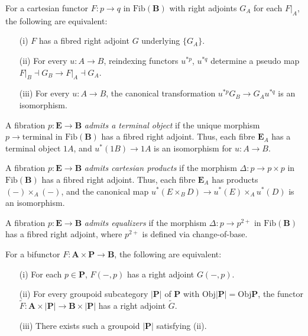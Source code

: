 \documentclass{article}
\begin{document}
\begin{proposition}
\label{prop:3.4}
For a cartesian functor $F : p \to q$ in $\text{Fib}(\mathbf{B})$ with right adjoints $G_A$ for each $\left.F\right|_A$, the following are equivalent:
\begin{enumerate}
    \item[(i)] $F$ has a fibred right adjoint $G$ underlying $\{ G_A \}$.
    \item[(ii)] For every $u : A \to B$, reindexing functors $u^{*p}$, $u^{*q}$ determine a pseudo map $\left.F\right|_B \dashv G_B \to \left.F\right|_A \dashv G_A$.
    \item[(iii)] For every $u : A \to B$, the canonical transformation $u^{*p} G_B \to G_A u^{*q}$ is an isomorphism.
\end{enumerate}
\end{proposition}

\begin{definition}
\label{def:3.5}
A fibration $p : \mathbf{E} \to \mathbf{B}$ \emph{admits a terminal object} if the unique morphism $p \to \text{terminal}$ in $\text{Fib}(\mathbf{B})$ has a fibred right adjoint. Thus, each fibre $\mathbf{E}_A$ has a terminal object $1 A$, and $u^*(1 B) \to 1 A$ is an isomorphism for $u : A \to B$.
\end{definition}

\begin{definition}
\label{def:3.6}
A fibration $p : \mathbf{E} \to \mathbf{B}$ \emph{admits cartesian products} if the morphism $\Delta : p \to p \times p$ in $\text{Fib}(\mathbf{B})$ has a fibred right adjoint. Thus, each fibre $\mathbf{E}_A$ has products $(-) \times_A (-)$, and the canonical map $u^*(E \times_B D) \to u^*(E) \times_A u^*(D)$ is an isomorphism.
\end{definition}

\begin{definition}
\label{def:3.7}
A fibration $p : \mathbf{E} \to \mathbf{B}$ \emph{admits equalizers} if the morphism $\Delta : p \to p^{2+}$ in $\text{Fib}(\mathbf{B})$ has a fibred right adjoint, where $p^{2+}$ is defined via change-of-base.
\end{definition}

\begin{lemma}
\label{lem:3.8}
For a bifunctor $F : \mathbf{A} \times \mathbf{P} \to \mathbf{B}$, the following are equivalent:
\begin{enumerate}
    \item[(i)] For each $p \in \mathbf{P}$, $F(-, p)$ has a right adjoint $G(-, p)$.
    \item[(ii)] For every groupoid subcategory $|\mathbf{P}|$ of $\mathbf{P}$ with $\text{Obj}|\mathbf{P}| = \text{Obj} \mathbf{P}$, the functor $\tilde{F} : \mathbf{A} \times |\mathbf{P}| \to \mathbf{B} \times |\mathbf{P}|$ has a right adjoint $\tilde{G}$.
    \item[(iii)] There exists such a groupoid $|\mathbf{P}|$ satisfying (ii).
\end{enumerate}
\end{lemma}
\end{document}
